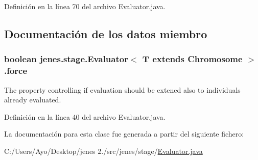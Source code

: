 Definición en la línea 70 del archivo Evaluator.\-java.



\subsection{Documentación de los datos miembro}
\hypertarget{classjenes_1_1stage_1_1_evaluator_3_01_t_01extends_01_chromosome_01_4_a8ad6c1bcd555e06450a444d2d18b6b89}{
\subsubsection[{force}]{\setlength{\rightskip}{0pt plus 5cm}boolean jenes.\-stage.\-Evaluator$<$ T extends Chromosome $>$.force\hspace{0.3cm}{\ttfamily [protected]}}}\label{classjenes_1_1stage_1_1_evaluator_3_01_t_01extends_01_chromosome_01_4_a8ad6c1bcd555e06450a444d2d18b6b89}
The property controlling if evaluation should be extened also to individuals already evaluated. 

Definición en la línea 40 del archivo Evaluator.\-java.



La documentación para esta clase fue generada a partir del siguiente fichero\-:\begin{DoxyCompactItemize}
\item 
C\-:/\-Users/\-Ayo/\-Desktop/jenes 2./src/jenes/stage/\hyperlink{_evaluator_8java}{Evaluator.\-java}\end{DoxyCompactItemize}
